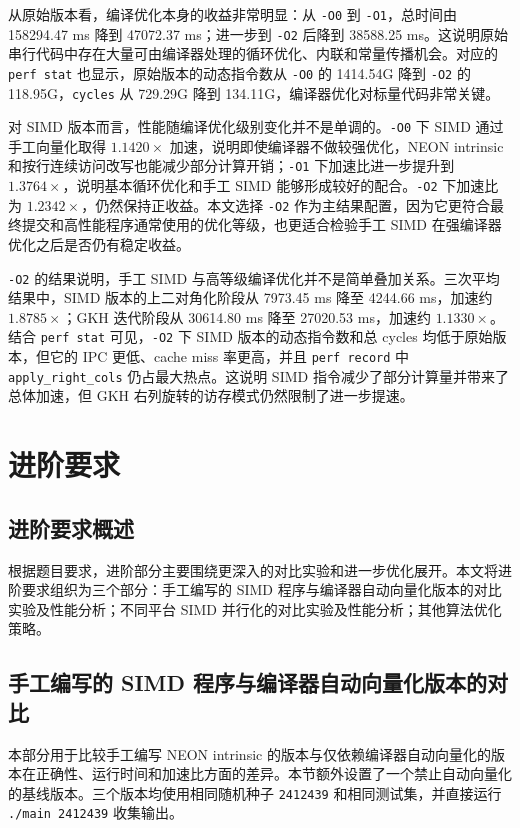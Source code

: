 \documentclass[UTF8,a4paper]{ctexart}
\begin{document}
从原始版本看，编译优化本身的收益非常明显：从 \texttt{-O0} 到 \texttt{-O1}，总时间由 158294.47 ms 降到 47072.37 ms；进一步到 \texttt{-O2} 后降到 38588.25 ms。这说明原始串行代码中存在大量可由编译器处理的循环优化、内联和常量传播机会。对应的 \texttt{perf stat} 也显示，原始版本的动态指令数从 \texttt{-O0} 的 1414.54G 降到 \texttt{-O2} 的 118.95G，\texttt{cycles} 从 729.29G 降到 134.11G，编译器优化对标量代码非常关键。

对 SIMD 版本而言，性能随编译优化级别变化并不是单调的。\texttt{-O0} 下 SIMD 通过手工向量化取得 \(1.1420\times\) 加速，说明即使编译器不做较强优化，NEON intrinsic 和按行连续访问改写也能减少部分计算开销；\texttt{-O1} 下加速比进一步提升到 \(1.3764\times\)，说明基本循环优化和手工 SIMD 能够形成较好的配合。\texttt{-O2} 下加速比为 \(1.2342\times\)，仍然保持正收益。本文选择 \texttt{-O2} 作为主结果配置，因为它更符合最终提交和高性能程序通常使用的优化等级，也更适合检验手工 SIMD 在强编译器优化之后是否仍有稳定收益。

\texttt{-O2} 的结果说明，手工 SIMD 与高等级编译优化并不是简单叠加关系。三次平均结果中，SIMD 版本的上二对角化阶段从 7973.45 ms 降至 4244.66 ms，加速约 \(1.8785\times\)；GKH 迭代阶段从 30614.80 ms 降至 27020.53 ms，加速约 \(1.1330\times\)。结合 \texttt{perf stat} 可见，\texttt{-O2} 下 SIMD 版本的动态指令数和总 cycles 均低于原始版本，但它的 IPC 更低、cache miss 率更高，并且 \texttt{perf record} 中 \texttt{apply\_right\_cols} 仍占最大热点。这说明 SIMD 指令减少了部分计算量并带来了总体加速，但 GKH 右列旋转的访存模式仍然限制了进一步提速。

\section{进阶要求}

\subsection{进阶要求概述}
根据题目要求，进阶部分主要围绕更深入的对比实验和进一步优化展开。本文将进阶要求组织为三个部分：手工编写的 SIMD 程序与编译器自动向量化版本的对比实验及性能分析；不同平台 SIMD 并行化的对比实验及性能分析；其他算法优化策略。

\subsection{手工编写的 SIMD 程序与编译器自动向量化版本的对比}
本部分用于比较手工编写 NEON intrinsic 的版本与仅依赖编译器自动向量化的版本在正确性、运行时间和加速比方面的差异。本节额外设置了一个禁止自动向量化的基线版本。三个版本均使用相同随机种子 \texttt{2412439} 和相同测试集，并直接运行 \texttt{./main 2412439} 收集输出。
\end{document}

